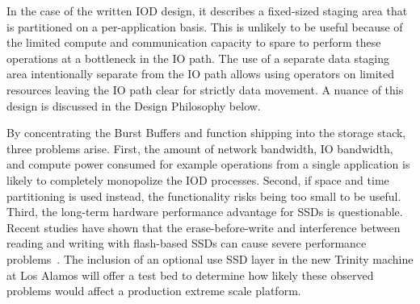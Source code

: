 \documentclass[conference]{IEEEtran}
\begin{document}
In the case of the written IOD design, it describes a fixed-sized staging area
that is partitioned on a per-application basis.  This is unlikely to be useful
because of the limited compute and communication capacity to spare to perform
these operations at a bottleneck in the IO path.  The use of a separate data
staging area intentionally separate from the IO path allows using operators on
limited resources leaving the IO path clear for strictly data movement. A
nuance of this design is discussed in the Design Philosophy below.

By concentrating the Burst Buffers and function shipping into the storage
stack, three problems arise.  First, the amount of network bandwidth, IO
bandwidth, and compute power consumed for example operations from a single
application is likely to completely monopolize the IOD processes. Second, if
space and time partitioning is used instead, the functionality risks being too
small to be useful. Third, the long-term hardware performance advantage for
SSDs is questionable. Recent studies have shown that the erase-before-write
and interference between reading and writing with flash-based SSDs can cause
severe performance problems~\cite{skourtis:2013:ssd-performance}. The inclusion
of an optional use SSD layer in the new Trinity machine at Los Alamos will
offer a test bed to determine how likely these observed problems would affect a
production extreme scale platform.

\end{document}
